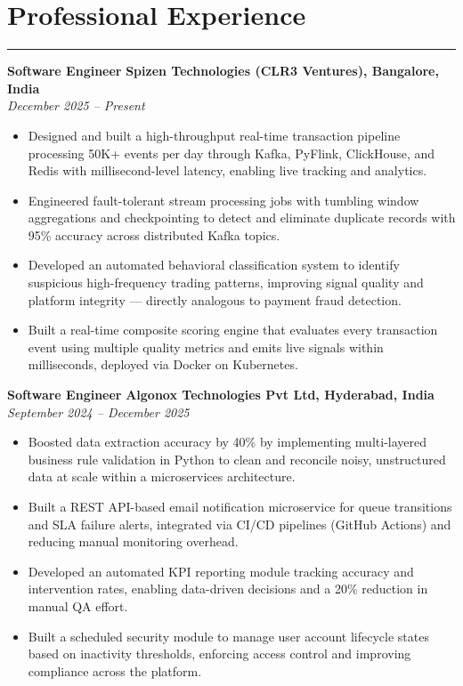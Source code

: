 \documentclass[10pt]{article}
\begin{document}
\section*{Professional Experience}
\vspace{1pt}\hrule\vspace{4pt}

\textbf{Software Engineer} \hfill \textbf{Spizen Technologies (CLR3 Ventures), Bangalore, India} \\
\textit{December 2025 -- Present}
\begin{itemize}
  \item Designed and built a high-throughput real-time transaction pipeline processing 50K+ events per day through Kafka, PyFlink, ClickHouse, and Redis with millisecond-level latency, enabling live tracking and analytics.
  \item Engineered fault-tolerant stream processing jobs with tumbling window aggregations and checkpointing to detect and eliminate duplicate records with 95\% accuracy across distributed Kafka topics.
  \item Developed an automated behavioral classification system to identify suspicious high-frequency trading patterns, improving signal quality and platform integrity — directly analogous to payment fraud detection.
  \item Built a real-time composite scoring engine that evaluates every transaction event using multiple quality metrics and emits live signals within milliseconds, deployed via Docker on Kubernetes.
\end{itemize}

\textbf{Software Engineer} \hfill \textbf{Algonox Technologies Pvt Ltd, Hyderabad, India} \\
\textit{September 2024 -- December 2025}
\begin{itemize}
  \item Boosted data extraction accuracy by 40\% by implementing multi-layered business rule validation in Python to clean and reconcile noisy, unstructured data at scale within a microservices architecture.
  \item Built a REST API-based email notification microservice for queue transitions and SLA failure alerts, integrated via CI/CD pipelines (GitHub Actions) and reducing manual monitoring overhead.
  \item Developed an automated KPI reporting module tracking accuracy and intervention rates, enabling data-driven decisions and a 20\% reduction in manual QA effort.
  \item Built a scheduled security module to manage user account lifecycle states based on inactivity thresholds, enforcing access control and improving compliance across the platform.
\end{itemize}
\end{document}
